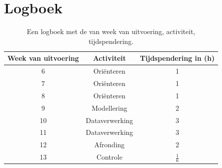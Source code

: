 \documentclass[numbers=endperiod]{scrartcl}
\begin{document}
\section{Logboek}
\begin{table}[ht]
\centering
\caption{Een logboek met de van week van uitvoering, activiteit, tijdspendering.}
\begin{tabular}{Scc}
\toprule
{Week van uitvoering} & Activiteit & Tijdspendering in (\si{\hour})\\
 & Oriënteren & 1\\
7 & Oriënteren & 1\\
8 & Oriënteren & 1\\
9 & Modellering & 2\\
10 & Dataverwerking & 3\\
11 & Dataverwerking & 3\\
12 & Afronding & 2\\
13 & Controle & $\frac{1}{6}$\\
\bottomrule
\end{tabular}
\end{table}
\end{document}
